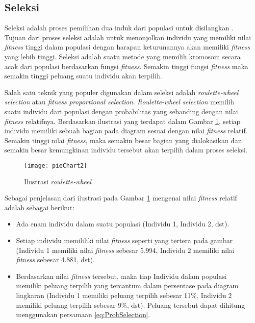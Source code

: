 \subsection{Seleksi}
\label{sub:selection}
Seleksi adalah proses pemilihan dua induk dari populasi untuk disilangkan \cite{sivanandam2007introduction}. Tujuan dari proses seleksi adalah untuk menonjolkan individu yang memiliki nilai \textit{fitness} tinggi dalam populasi dengan harapan keturunannya akan memiliki \textit{fitness} yang lebih tinggi. Seleksi adalah suatu metode yang memilih kromosom secara acak dari populasi berdasarkan fungsi \textit{fitness}. Semakin tinggi fungsi \textit{fitness} maka semakin tinggi peluang suatu individu akan terpilih. 

Salah satu teknik yang populer digunakan dalam seleksi adalah \textit{roulette-wheel selection} atau \textit{fitness proportional selection}. \textit{Roulette-wheel selection} memilih suatu individu dari populasi dengan probabilitas yang sebanding dengan nilai \textit{fitness} relatifnya. Berdasarkan ilustrasi yang terdapat dalam Gambar \ref{fig:pieChart}, setiap individu memiliki sebuah bagian pada diagram sesuai dengan nilai \textit{fitness} relatif. Semakin tinggi nilai \textit{fitness}, maka semakin besar bagian yang dialokasikan dan semakin besar kemungkinan individu tersebut akan terpilih dalam proses seleksi.

\begin{figure}[h]
	\begin{center}
		\texttt{[image: pieChart2]}
		\caption{Ilustrasi \textit{roulette-wheel}}
		\label{fig:pieChart}
	\end{center}
\end{figure}

Sebagai penjelasan dari ilustrasi pada Gambar \ref{fig:pieChart} mengenai nilai \textit{fitness} relatif adalah sebagai berikut:
\begin{itemize}
	\item Ada enam individu dalam suatu populasi (Individu 1, Individu 2, dst).
	\item Setiap individu memililiki nilai \textit{fitness} seperti yang tertera pada gambar (Individu 1 memiliki nilai \textit{fitness} sebesar 5.994, Individu 2 memiliki nilai \textit{fitness} sebesar 4.881, dst).
	\item Berdasarkan nilai \textit{fitness} tersebut, maka tiap Individu dalam populasi memiliki peluang terpilih yang tercantum dalam persentase pada diagram lingkaran (Individu 1 memiliki peluang terpilih sebesar 11\%, Individu 2 memiliki peluang terpilih sebesar 9\%, dst). Peluang tersebut dapat dihitung menggunakan persamaan \ref{eq:ProbSelection}.
\end{itemize}

